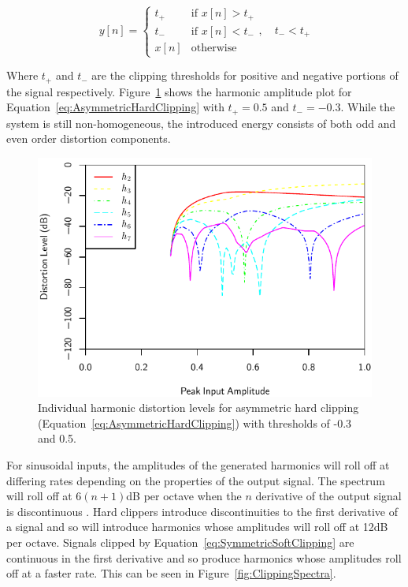 			\begin{equation}
				y[n] = \begin{cases}
					t_{+} & \text{if $x[n] > t_{+}$} \\
					t_{-} & \text{if $x[n] < t_{-}$} \\
					x[n] & \text{otherwise}
				\end{cases}, \quad t_{-} < t_{+}
				\label{eq:AsymmetricHardClipping}
			\end{equation}

			Where $t_{+}$ and $t_{-}$ are the clipping thresholds for positive and negative portions of the
			signal respectively. Figure~\ref{fig:AsymmetricHardClippingHarmonics} shows the harmonic amplitude
			plot for Equation~\ref{eq:AsymmetricHardClipping} with $t_{+} = 0.5$ and $t_{-} = -0.3$. While the
			system is still non-homogeneous, the introduced energy consists of both odd and even order
			distortion components.

			\begin{figure}[h!]
				\centering
				\includegraphics{chapter5/Images/AsymmetricHardClippingHarmonics.pdf}
				\caption{Individual harmonic distortion levels for asymmetric hard clipping
					 (Equation~\ref{eq:AsymmetricHardClipping}) with thresholds of -0.3 and 0.5.}
				\label{fig:AsymmetricHardClippingHarmonics}
			\end{figure}

			For sinusoidal inputs, the amplitudes of the generated harmonics will roll off at differing rates
			depending on the properties of the output signal. The spectrum will roll off at $6(n+1)$dB per
			octave when the $n$ derivative of the output signal is discontinuous
			\citep{kraght2000aliasing}.  Hard clippers introduce discontinuities to the first derivative of a
			signal and so will introduce harmonics whose amplitudes will roll off at 12dB per octave. Signals
			clipped by Equation~\ref{eq:SymmetricSoftClipping} are continuous in the first derivative and so
			produce harmonics whose amplitudes roll off at a faster rate. This can be seen in
			Figure~\ref{fig:ClippingSpectra}.

